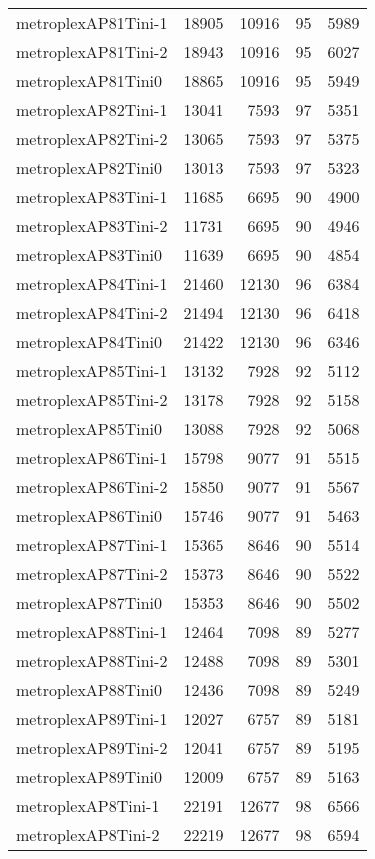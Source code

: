 \begin{longtable}{lrrrr}
metroplexAP81Tini-1 & 18905 & 10916 & 95 & 5989 \\
metroplexAP81Tini-2 & 18943 & 10916 & 95 & 6027 \\
metroplexAP81Tini0 & 18865 & 10916 & 95 & 5949 \\
metroplexAP82Tini-1 & 13041 & 7593 & 97 & 5351 \\
metroplexAP82Tini-2 & 13065 & 7593 & 97 & 5375 \\
metroplexAP82Tini0 & 13013 & 7593 & 97 & 5323 \\
metroplexAP83Tini-1 & 11685 & 6695 & 90 & 4900 \\
metroplexAP83Tini-2 & 11731 & 6695 & 90 & 4946 \\
metroplexAP83Tini0 & 11639 & 6695 & 90 & 4854 \\
metroplexAP84Tini-1 & 21460 & 12130 & 96 & 6384 \\
metroplexAP84Tini-2 & 21494 & 12130 & 96 & 6418 \\
metroplexAP84Tini0 & 21422 & 12130 & 96 & 6346 \\
metroplexAP85Tini-1 & 13132 & 7928 & 92 & 5112 \\
metroplexAP85Tini-2 & 13178 & 7928 & 92 & 5158 \\
metroplexAP85Tini0 & 13088 & 7928 & 92 & 5068 \\
metroplexAP86Tini-1 & 15798 & 9077 & 91 & 5515 \\
metroplexAP86Tini-2 & 15850 & 9077 & 91 & 5567 \\
metroplexAP86Tini0 & 15746 & 9077 & 91 & 5463 \\
metroplexAP87Tini-1 & 15365 & 8646 & 90 & 5514 \\
metroplexAP87Tini-2 & 15373 & 8646 & 90 & 5522 \\
metroplexAP87Tini0 & 15353 & 8646 & 90 & 5502 \\
metroplexAP88Tini-1 & 12464 & 7098 & 89 & 5277 \\
metroplexAP88Tini-2 & 12488 & 7098 & 89 & 5301 \\
metroplexAP88Tini0 & 12436 & 7098 & 89 & 5249 \\
metroplexAP89Tini-1 & 12027 & 6757 & 89 & 5181 \\
metroplexAP89Tini-2 & 12041 & 6757 & 89 & 5195 \\
metroplexAP89Tini0 & 12009 & 6757 & 89 & 5163 \\
metroplexAP8Tini-1 & 22191 & 12677 & 98 & 6566 \\
metroplexAP8Tini-2 & 22219 & 12677 & 98 & 6594 \\

\end{longtable}
